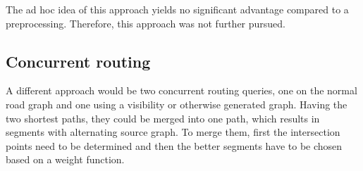 		The ad hoc idea of this approach yields no significant advantage compared to a preprocessing.
		Therefore, this approach was not further pursued.
		
		
	
	\subsection{Concurrent routing}
	
		A different approach would be two concurrent routing queries, one on the normal road graph and one using a visibility or otherwise generated graph.
		Having the two shortest paths, they could be merged into one path, which results in segments with alternating source graph.
		To merge them, first the intersection points need to be determined and then the better segments have to be chosen based on a weight function.
		
